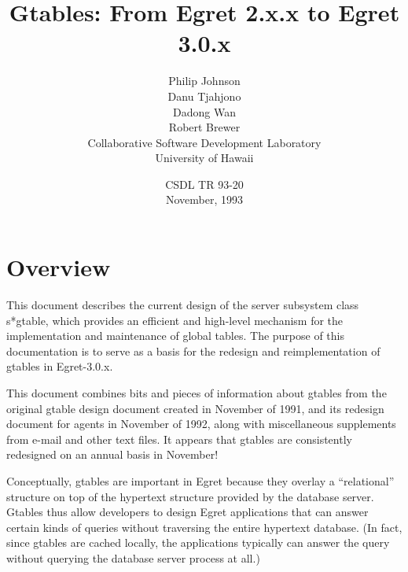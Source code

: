 


\title{{\bf Gtables: From Egret 2.x.x to Egret 3.0.x}}
\author {Philip Johnson\\
         Danu Tjahjono\\
         Dadong Wan\\
         Robert Brewer\\
         Collaborative Software Development Laboratory\\
         University of Hawaii}
\date{CSDL TR 93-20\\November, 1993}

\maketitle
\newpage
\tableofcontents
\newpage

\section{Overview}

This document describes the current design of the server subsystem class
s*gtable, which provides an efficient and high-level mechanism for the
implementation and maintenance of global tables.  The purpose of this
documentation is to serve as a basis for the redesign and reimplementation
of gtables in Egret-3.0.x. 

This document combines bits and pieces of information about gtables from
the original gtable design document created in November of 1991, and its
redesign document for agents in November of 1992, along with miscellaneous
supplements from e-mail and other text files.  It appears that gtables are
consistently redesigned on an annual basis in November!

Conceptually, gtables are important in Egret because they overlay a
``relational'' structure on top of the hypertext structure provided by the
database server.  Gtables thus allow developers to design Egret
applications that can answer certain kinds of queries without traversing
the entire hypertext database.  (In fact, since gtables are cached locally,
the applications typically can answer the query without querying the
database server process at all.)


